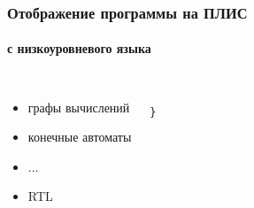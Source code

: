 \documentclass{beamer}              %
\begin{document}
\begin{frame}[fragile]
\frametitle{Отображение программы на ПЛИС}
  \framesubtitle{с низкоуровневого языка}
  \begin{columns}
        \begin{itemize}
            \item графы вычислений
            \item конечные автоматы
            \item ...
            \item RTL
        \end{itemize}      



\begin{lstlisting}[frame=single]

}
\end{lstlisting}
\label{encode_listing}
      
  \end{columns}
  
\end{frame}


\end{document}
